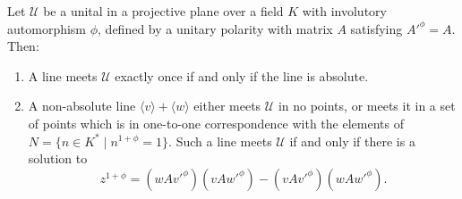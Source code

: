 Let $\mathcal{U}$ be a unital in a projective plane over a field $K$ with involutory automorphism $\phi$, defined by a unitary polarity with matrix $A$ satisfying $A'^{\phi} = A$. Then:

\begin{enumerate}
\item[(i)] A line meets $\mathcal{U}$ exactly once if and only if the line is absolute.
\item[(ii)] A non-absolute line $\langle v \rangle + \langle w \rangle$ either meets $\mathcal{U}$ in no points, or meets it in a set of points which is in one-to-one correspondence with the elements of $N = \{ n \in K^* \mid n^{1+\phi} = 1 \}$. Such a line meets $\mathcal{U}$ if and only if there is a solution to
$$z^{1+\phi} = (w A v'^{\phi})(v A w'^{\phi}) - (v A v'^{\phi})(w A w'^{\phi}).$$
\end{enumerate}
